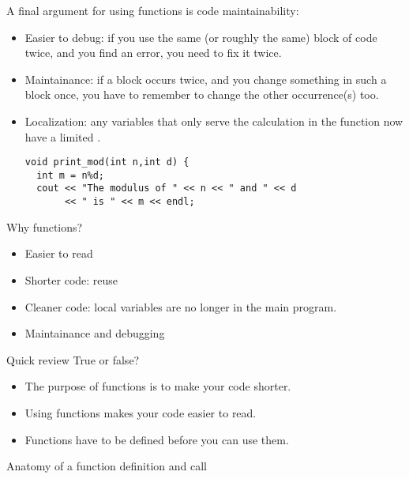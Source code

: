 A final argument for using functions is code maintainability:
\begin{itemize}
\item Easier to debug: if you use the same (or roughly the same) block
  of code twice, and you find an error, you need to fix it twice.
\item Maintainance: if a block occurs twice, and  you change something in such a block
  once, you have to remember to change the other occurrence(s) too.
\item Localization: any variables that only serve the calculation in
  the function now have a limited .
\begin{verbatim}
void print_mod(int n,int d) {
  int m = n%d;
  cout << "The modulus of " << n << " and " << d 
       << " is " << m << endl;
\end{verbatim}
\end{itemize}

\begin{slide}{Why functions?}
  \label{sl:func-why}
  \begin{itemize}
  \item Easier to read
  \item Shorter code: reuse
  \item Cleaner code: local variables are no longer in the main program.
  \item Maintainance and debugging
  \end{itemize}
\end{slide}

\begin{exercise}{Quick review}
  \label{rev:func-why}
  True or false?
  \begin{itemize}
  \item The purpose of functions is to make your code shorter.
  \item Using functions makes your code easier to read.
  \item Functions have to be defined before you can use them.
  \end{itemize}
\end{exercise}

 {Anatomy of a function definition and call}

